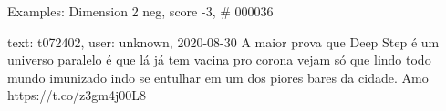 \begin{frame}{Examples: Dimension 2 neg, score -3, \# 000036}
\footnotesize
\begin{alertblock}{text: t072402, user: unknown, 2020-08-30}
A maior prova que Deep Step é um universo paralelo é que lá já tem vacina pro 
corona  vejam só que lindo todo mundo 
imunizado indo se entulhar em um dos piores bares da cidade. Amo 
\textbf{} https://t.co/z3gm4j00L8 
\end{alertblock}
\end{frame}

